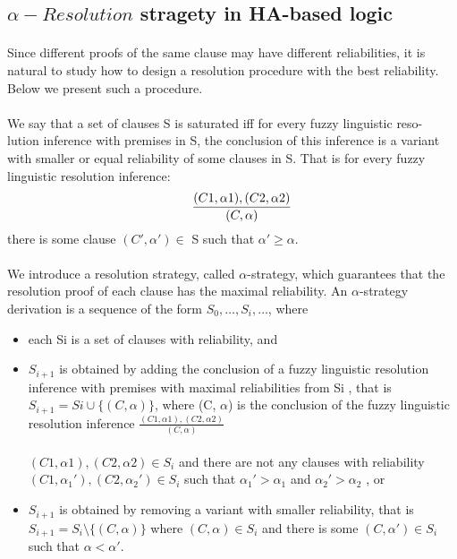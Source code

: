 \documentclass[part1.tex]{subfiles}
\begin{document}
\subsection{$\alpha-Resolution$ stragety in HA-based logic}
\paragraph{} Since different proofs of the same clause may have different reliabilities, 
it is natural to study how to design a resolution procedure with the best reliability. 
Below we present such a procedure.
\paragraph{} 
We say that a set of clauses S is saturated iff for every fuzzy linguistic reso-
lution inference with premises in S, the conclusion of this inference is a variant
with smaller or equal reliability of some clauses in S. That is for every fuzzy
linguistic resolution inference:\\
\[\indent \frac{(C1, \alpha1), (C2, \alpha2)}{(C,\alpha)}
\]
\indent there is some clause \((C',\alpha') \in \) S such that \(\alpha' \ge \alpha\).
\paragraph{} 
We introduce a resolution strategy, called $\alpha$-strategy, which guarantees that
the resolution proof of each clause has the maximal reliability. An $\alpha$-strategy
derivation is a sequence of the form $S_{0},\ldots,S_{i},\ldots$, where
\begin{itemize} 
	\item each Si is a set of clauses with reliability, and
	\item  \(S_{i+1}\) is obtained by adding the conclusion of a fuzzy 
	linguistic resolution inference with premises with maximal reliabilities 
	from Si , that is \(S_{i+1} = Si \cup \{(C, \alpha)\}\), 
	where (C, $\alpha$) is the conclusion of the fuzzy linguistic resolution inference  
	\(\frac{(C1 , \alpha1), (C2 , \alpha2)}	{(C, \alpha)}\)
	\\\\	
	$(C1 , \alpha1 ), (C2 , \alpha2 ) \in S_{i}$ and there are not any clauses 
	with reliability $(C1 , \alpha_{1}' ), (C2 , \alpha_{2}' ) \in S_{i}$ such that
			$\alpha_{1}' > \alpha_{1}$ and $\alpha_{2}' > \alpha_{2}$ , or

		\item $S_{i+1}$ is obtained by removing a variant with smaller 
			reliability, that is $S_{i+1} = S_{i} \setminus \{(C, \alpha)\}$ 
			where $(C, \alpha) \in S_{i}$ and there is some
			$(C, \alpha') \in S_{i}$ such that $\alpha < \alpha'$.
\end{itemize}
\end{document}
